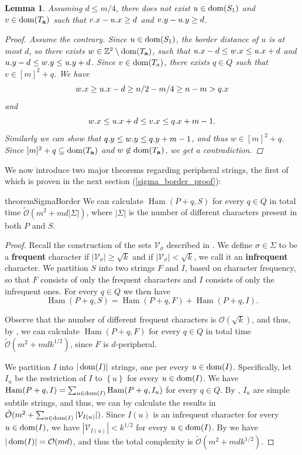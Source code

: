 \documentclass[11pt, letterpaper]{article}
\theoremstyle{plain}
\newtheorem{lemma}{Lemma}
\theoremstyle{definition}
\theoremstyle{remark}
\newcommand{\Z}{\mathbb{Z}}
\renewcommand{\O}{\mathcal{O}}
\newcommand{\tO}{\tilde{\mathcal{O}}}
\newcommand{\V}{\mathcal{V}}
\newcommand{\set}[1]{\left\lbrace #1 \right\rbrace}
\DeclareMathOperator*{\Ham}{Ham}
\begin{document}
\begin{lemma} \label{border_lemma}
	Assuming $d \le m/4$, there does not exist $u \in \operatorname*{dom}(S_1)$ and $v \in \operatorname*{dom}(T_\mathbf{a})$ such that $v.x - u.x \ge d$ and $v.y - u.y \ge d$.
	\begin{proof}
		Assume the contrary.
		Since $u \in \operatorname*{dom}(S_1)$, the border distance of $u$ is at most $d$, so there exists $w \in \Z^2 \setminus \d{\Ta}$, such that
		$u.x - d \le w.x \le u.x + d$ and
		$u.y - d \le w.y \le u.y + d$.
		Since $v \in \operatorname*{dom}(T_a)$, there exists $q \in Q$ such that $v \in [m]^2 + q$.
		We have
		\[ w.x \ge u.x - d \ge n / 2 - m / 4 \ge n - m > q.x \]
		and
		\[ w.x \le u.x + d \le v.x \le q.x + m - 1. \]
		Similarly we can show that $q.y \le w.y \le q.y + m - 1$, and thus $w \in [m]^2 + q$.
		Since $[m]^2 + q \subseteq \operatorname*{dom}(T_\mathbf{a})$ and $w \not \in \operatorname*{dom}(T_\mathbf{a})$, we get a contradiction.
	\end{proof}
\end{lemma}

We now introduce two major theorems regarding peripheral strings, the first of which is proven in the next section (\ref{sigma_border_proof}):

\begin{restatable*}{theorem}{SigmaBorder}\label{sigma_border}
	We can calculate $\Ham(P + q, S)$ for every $q \in Q$ in total time $\tO(m^2 + md |\Sigma|)$, where $|\Sigma|$ is the number of different characters present in both $P$ and $S$.
\end{restatable*}

\DenseAlgo
\begin{proof}
	Recall the construction of the sets $\V_\sigma$ described in .
	We define $\sigma \in \Sigma$ to be a \textbf{frequent} character if $|\V_\sigma| \ge \sqrt{k}$ and if $|\V_\sigma| < \sqrt{k}$, we call it an \textbf{infrequent} character.
	We partition $S$ into two strings $F$ and $I$, based on character frequency,
	so that $F$ consists of only the frequent characters and $I$ consists of only the infrequent ones.
	For every $q \in Q$ we then have 
	\[\Ham(P + q, S) = \Ham(P + q, F) + \Ham(P + q, I).\]
	
	Observe that the number of different frequent characters is $\O(\sqrt{k})$, and thus, by , we can calculate $\Ham(P + q, F)$ for every $q \in Q$ in total time $\tO(m^2 + mdk^{1/2})$, since $F$ is $d$-peripheral. 
	
	We partition $I$ into $|\operatorname*{dom}(I)|$ strings, one per every $u \in \operatorname*{dom}(I)$.
	Specifically, let $I_u$ be the restriction of $I$ to $\set{u}$ for every $u \in \operatorname*{dom}(I)$.
	We have $\Ham(P + q, I) = \sum_{u \in \d{I}} \Ham(P + q, I_u)$ for every $q \in Q$.
	By , $I_u$ are simple subtile strings, and thus, we can by  calculate the results in $\tO(m^2 + \sum_{u \in \d{I}} |\V_{I(u)}|)$.
	Since $I(u)$ is an infrequent character for every $u \in \operatorname*{dom}(I)$, we have $|\V_{I(u)}| < k^{1/2}$ for every $u \in \operatorname*{dom}(I)$.
	By  we have $|\d{I}| = \O(md)$, and thus the total complexity is $\tO(m^2 + mdk^{1/2})$.
\end{proof}
\end{document}

